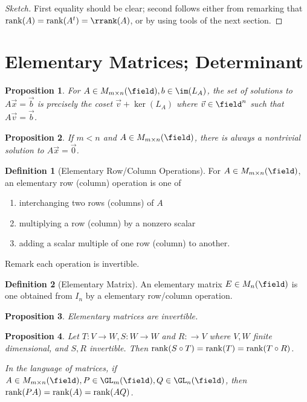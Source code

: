 \documentclass[12pt, oneside]{article}
\theoremstyle{definition}
\newtheorem{defn}{Definition}
\theoremstyle{plain}
\newtheorem{prop}{Proposition}
\theoremstyle{remark}
\let\origsection=\section
\renewcommand\section[1]{\origsection{#1}\label{sec:\thesection}}
\begin{document}
\begin{proof}[Sketch]
  First equality should be clear; second follows either from remarking that $\rank(A) = \rank(A^t) = \rrank(A)$, or by using tools of the next section.
\end{proof}

\section{Elementary Matrices; Determinant}

\begin{prop}
  For $A \in M_{m \times n}(\field), b \in \im(L_A)$, the set of solutions to $A \vec{x} = \vec{b}$ is precisely the \emph{coset} $\vec{v} + \ker(L_A)$ where $\vec{v} \in \field^n$ such that $A \vec{v} = \vec{b}$.
\end{prop}

\begin{prop}
  If $m < n$ and $A \in M_{m \times n}(\field)$, there is always a nontrivial solution to $A \vec{x} = \vec{0}$.
\end{prop}

\begin{defn}[Elementary Row/Column Operations]
  For $A \in M_{m \times n}(\field)$, an elementary row (column) operation is one of \begin{enumerate}
    \item interchanging two rows (columns) of $A$
    \item multiplying a row (column) by a nonzero scalar
    \item adding a scalar multiple of one row (column) to another.
  \end{enumerate}
  Remark each operation is invertible.
\end{defn}

\begin{defn}[Elementary Matrix]
  An elementary matrix $E \in M_{n}(\field)$ is one obtained from $I_n$ by a elementary row/column operation.
\end{defn}

\begin{prop}\label{prop:elementaryinvertible}
  Elementary matrices are invertible.
\end{prop}

\begin{prop}\label{prop:rankpreserve}
  Let $T : V \to W, S : W \to W$ and $R : \to V$ where $V, W$ finite dimensional, and $S, R$ invertible. Then $\rank(S \circ T) = \rank(T) = \rank(T \circ R)$.

  In the language of matrices, if $A \in M_{m \times n}(\field), P \in \GL_m(\field), Q \in \GL_n(\field)$, then $\rank(PA) = \rank(A) = \rank(A Q)$.
\end{prop}
\end{document}
